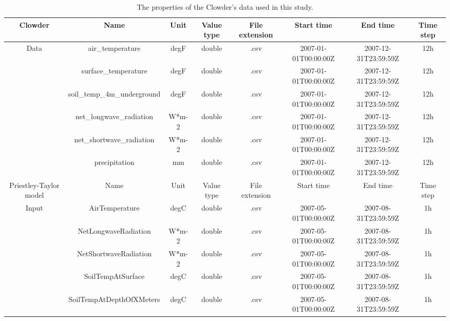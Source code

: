 \documentclass[review]{elsarticle}
\begin{document}
\begin{landscape}
\begin{table}[h]
\small
\centering
\renewcommand{\arraystretch}{0.6}
\caption{The properties of the Clowder's data used in this study.}
\label{tabel1}
\begin{tabular}{*8c}
\toprule
Clowder&Name&Unit &Value type&File extension & Start time & End time & Time step                      \\
\midrule
\multirow{6}{*}{Data}&air\_temperature                      & degF        & double    & .csv  & 2007-01-01T00:00:00Z & 2007-12-31T23:59:59Z & 12h       \\
					    	      &surface\_temperature               & degF       & double    & .csv   & 2007-01-01T00:00:00Z & 2007-12-31T23:59:59Z & 12h       \\
							  &soil\_temp\_4m\_underground & degF        & double    & .csv  & 2007-01-01T00:00:00Z & 2007-12-31T23:59:59Z & 12h       \\
							  &net\_longwave\_radiation         & W*m-2     & double    & .csv   & 2007-01-01T00:00:00Z & 2007-12-31T23:59:59Z & 12h       \\
							  &net\_shortwave\_radiation       & W*m-2      & double    & .csv   & 2007-01-01T00:00:00Z & 2007-12-31T23:59:59Z & 12h       \\
							  &precipitation                             & mm           & double    & .csv   & 2007-01-01T00:00:00Z & 2007-12-31T23:59:59Z & 12h      \\
\midrule
Priestley-Taylor model&Name&Unit &Value type&File extension & Start time & End time & Time step                      \\
\midrule
\multirow{6}{*}{Input}&AirTemperature                     & degC     & double    & .csv   & 2007-05-01T00:00:00Z & 2007-08-31T23:59:59Z & 1h       \\
							  &NetLongwaveRadiation        & W*m-2   & double    & .csv   & 2007-05-01T00:00:00Z & 2007-08-31T23:59:59Z & 1h       \\
							  &NetShortwaveRadiation        & W*m-2  & double    & .csv   & 2007-05-01T00:00:00Z & 2007-08-31T23:59:59Z & 1h       \\
							  &SoilTempAtSurface               & degC     & double    & .csv   & 2007-05-01T00:00:00Z & 2007-08-31T23:59:59Z & 1h       \\
							  &SoilTempAtDepthOfXMeters & degC     & double    & .csv   & 2007-05-01T00:00:00Z & 2007-08-31T23:59:59Z & 1h       \\

\end{tabular}
\end{table}
\end{landscape}
\end{document}

